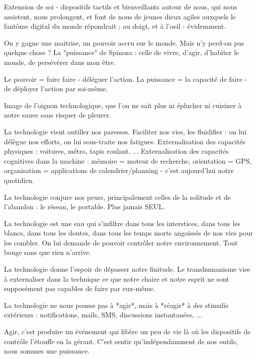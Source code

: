 Extension de soi - dispositifs tactils et bienveillants autour de nous, qui nous assistent,
nous prolongent, et font de nous de jeunes dieux agiles auxquels le fantôme digital du monde répondrait
; au doigt, et à l'oeil - évidemment.

On y gagne une maitrise, un pouvoir accru sur le monde. Mais n'y perd-on pas quelque chose ?
La "puissance" de Spinoza : celle de vivre, d'agir, d'habiter le monde, de persévérer dans mon être.

Le pouvoir = faire faire - déléguer l'action.
La puissance = la capacité de faire - de déployer l'action par soi-même.

Image de l'oignon technologique, que l'on ne sait plus ni éplucher ni cuisiner à notre
sauce sans risquer de pleurer.

La technologie vient outiller nos paresses. Faciliter nos vies, les fluidifier : on lui
délègue nos efforts, on lui sous-traite nos fatigues. Externalisation des capacités physiques :
voitures, métro, tapis roulant, ... Externalisation des capacités cognitives dans la machine :
mémoire = moteur de recherche, orientation = GPS, organisation = applications de
calendrier/planning - c'est aujourd'hui notre quotidien.

La technologie conjure nos peurs, principalement celles de la solitude et de l'abandon :
le réseau, le portable. Plus jamais SEUL.

La technologie est une eau qui s'infiltre dans tous les interstices, dans tous les blancs,
dans tous les doutes, dans tous les temps morts angoissés de nos vies pour les combler.
On lui demande de pouvoir contrôler notre environnement. Tout bouge sans que rien n'arrive. 

La technologie donne l'espoir de dépasser notre finitude. Le transhumanisme vise à
externaliser dans la technique ce que notre chaire et notre esprit ne sont supposément
pas capables de faire par eux-même.

La technologie ne nous pousse pas à *agir*, mais à *réagir* à des stimulis extérieurs :
notifications, mails, SMS, discussions instantanées, ...

Agir, c'est produire un événement qui libère un peu de vie là où les dispositifs de contrôle
l'étouffe en la gérant. C'est sentir qu'indépendamment de nos outils, nous sommes une puissance.
